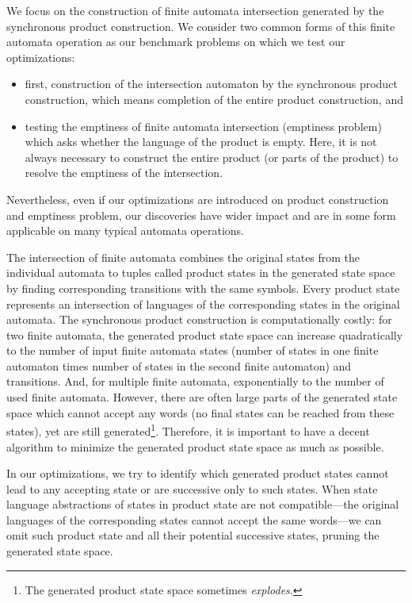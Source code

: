 We focus on the construction of finite automata intersection generated by the synchronous product construction. We consider two common forms of this finite automata operation as our benchmark problems on which we test our optimizations:

\begin{itemize}
    \item first, construction of the intersection automaton by the synchronous product construction, which means completion of the entire product construction, and
    \item testing the emptiness of finite automata intersection (emptiness problem) which asks whether the language of the product is empty. Here, it is not always necessary to construct the entire product (or parts of the product) to resolve the emptiness of the intersection.
\end{itemize}

Nevertheless, even if our optimizations are introduced on product construction and emptiness problem, our discoveries have wider impact and are in some form applicable on many typical automata operations.


The intersection of finite automata combines the original states from the individual automata to tuples called product states in the generated state space by finding corresponding transitions with the same symbols. Every product state represents an intersection of languages of the corresponding states in the original automata. The synchronous product construction is computationally costly: for two finite automata, the generated product state space can increase quadratically to the number of input finite automata states (number of states in one finite automaton times number of states in the second finite automaton) and transitions. And, for multiple finite automata, exponentially to the number of used finite automata. However, there are often large parts of the generated state space which cannot accept any words (no final states can be reached from these states), yet are still generated\footnote{The generated product state space sometimes \emph{explodes}.}. Therefore, it is important to have a decent algorithm to minimize the generated product state space as much as possible.


In our optimizations, we try to identify which generated product states cannot lead to any accepting state or are successive only to such states. When state language abstractions of states in product state are not compatible---the original languages of the corresponding states cannot accept the same words---we can omit such product state and all their potential successive states, pruning the generated state space.

